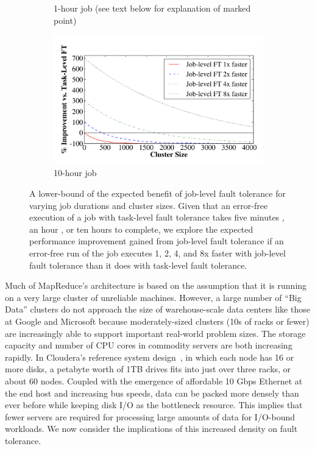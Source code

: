 \begin{figure}[t]
\begin{subfigure}[t]{0.47\textwidth}
\caption{\label{fig:ft_motivation60} 1-hour job (see text below for explanation of marked point)}
\end{subfigure}
\begin{subfigure}[t]{0.47\textwidth}
\centering
\includegraphics[width=\textwidth]{themis/graphs/analytical_failure_motivation/factor_600min}
\caption{\label{fig:ft_motivation600}10-hour job}
\end{subfigure}
\caption{\label{fig:ft_motivation} A lower-bound of the expected benefit of
  job-level fault tolerance for varying job durations and cluster sizes. Given
  that an error-free execution of a job with task-level fault tolerance takes
  five minutes , an hour ,
  or ten hours  to complete, we explore the
  expected performance improvement gained from job-level fault tolerance if an
  error-free run of the job executes 1, 2, 4, and 8x faster with job-level
  fault tolerance than it does with task-level fault tolerance.}
\end{figure}

Much of MapReduce's architecture is based on the assumption that it is running
on a very large cluster of unreliable machines.  However, a large number of
``Big Data'' clusters do not approach the size of warehouse-scale data centers
like those at Google and Microsoft because moderately-sized clusters (10s of
racks or fewer) are increasingly able to support important real-world problem
sizes.  The storage capacity and number of CPU cores in commodity servers are
both increasing rapidly.  In Cloudera's reference system
design~\cite{ClouderaDellHadoopPlatform}, in which each node has 16 or more
disks, a petabyte worth of 1TB drives fits into just over three racks, or about
60 nodes.  Coupled with the emergence of affordable 10 Gbps Ethernet at the end
host and increasing bus speeds, data can be packed more densely than ever
before while keeping disk I/O as the bottleneck resource.  This implies that
fewer servers are required for processing large amounts of data for I/O-bound
workloads.  We now consider the implications of this increased density on fault
tolerance.

